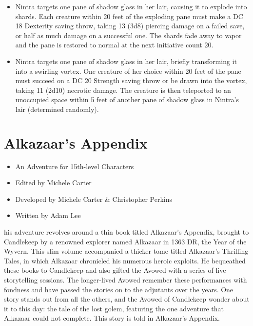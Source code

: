 \documentclass[10pt,a4paper,twoside,bg=print,twocolumn,openany,nodeprecatedcode]{dndbook}
\begin{document}
\begin{itemize}
\item Nintra targets one pane of shadow glass in her lair, causing it to explode into shards. Each creature within 20 feet of the exploding pane must make a DC 18 Dexterity saving throw, taking 13 (3d8) piercing damage on a failed save, or half as much damage on a successful one. The shards fade away to vapor and the pane is restored to normal at the next initiative count 20.
\item Nintra targets one pane of shadow glass in her lair, briefly transforming it into a swirling vortex. One creature of her choice within 20 feet of the pane must succeed on a DC 20 Strength saving throw or be drawn into the vortex, taking 11 (2d10) necrotic damage. The creature is then teleported to an unoccupied space within 5 feet of another pane of shadow glass in Nintra's lair (determined randomly).
\end{itemize}

\chapter{Alkazaar's Appendix}

\begin{itemize}
\item An Adventure for 15th-level Characters
\item Edited by Michele Carter
\item Developed by Michele Carter \& Christopher Perkins
\item Written by Adam Lee
\end{itemize}

his adventure revolves around a thin book titled Alkazaar's Appendix, brought to Candlekeep by a renowned explorer named Alkazaar in 1363 DR, the Year of the Wyvern. This slim volume accompanied a thicker tome titled Alkazaar's Thrilling Tales, in which Alkazaar chronicled his numerous heroic exploits. He bequeathed these books to Candlekeep and also gifted the Avowed with a series of live storytelling sessions. The longer-lived Avowed remember these performances with fondness and have passed the stories on to the adjutants over the years. One story stands out from all the others, and the Avowed of Candlekeep wonder about it to this day: the tale of the lost golem, featuring the one adventure that Alkazaar could not complete. This story is told in Alkazaar's Appendix.
\end{document}
